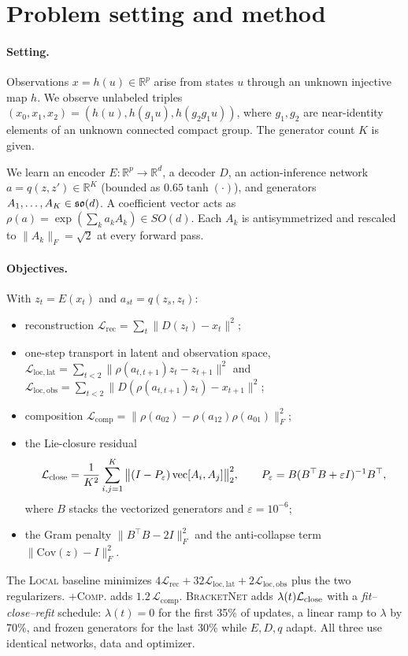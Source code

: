 \section{Problem setting and method}\label{sec:method}
\paragraph{Setting.}
Observations $x=h(u)\in\mathbb R^p$ arise from states $u$ through an unknown injective map $h$. We observe
unlabeled triples $(x_0,x_1,x_2)=(h(u),h(g_1u),h(g_2g_1u))$, where $g_1,g_2$ are near-identity elements of an
unknown connected compact group. The generator count $K$ is given.

We learn an encoder $E:\mathbb R^p\to\mathbb R^d$, a decoder $D$, an action-inference network
$a=q(z,z')\in\mathbb R^K$ (bounded as $0.65\tanh(\cdot)$), and generators $A_1,\dots,A_K\in\mathfrak{so}(d)$. A
coefficient vector acts as $\rho(a)=\exp(\sum_ka_kA_k)\in SO(d)$. Each $A_k$ is antisymmetrized and rescaled
to $\|A_k\|_F=\sqrt2$ at every forward pass.

\paragraph{Objectives.}
With $z_t=E(x_t)$ and $a_{st}=q(z_s,z_t)$:
\begin{itemize}
\item reconstruction $\mathcal L_{\mathrm{rec}}=\sum_t\|D(z_t)-x_t\|^2$;
\item one-step transport in latent and observation space,
  $\mathcal L_{\mathrm{loc,lat}}=\sum_{t<2}\|\rho(a_{t,t+1})z_t-z_{t+1}\|^2$ and
  $\mathcal L_{\mathrm{loc,obs}}=\sum_{t<2}\|D(\rho(a_{t,t+1})z_t)-x_{t+1}\|^2$;
\item composition $\mathcal L_{\mathrm{comp}}=\|\rho(a_{02})-\rho(a_{12})\rho(a_{01})\|_F^2$;
\item the Lie-closure residual
\begin{equation}\label{eq:close}
\mathcal{L}_{\mathrm{close}}=\frac1{K^2}\sum_{i,j=1}^K\big\|(I-P_\varepsilon)\operatorname{vec}[A_i,A_j]\big\|_2^2,\qquad
P_\varepsilon=B(B^\top B+\varepsilon I)^{-1}B^\top ,
\end{equation}
where $B$ stacks the vectorized generators and $\varepsilon=10^{-6}$;
\item the Gram penalty $\|B^\top B-2I\|_F^2$ and the anti-collapse term $\|\mathrm{Cov}(z)-I\|_F^2$.
\end{itemize}

The \textsc{Local} baseline minimizes $4\mathcal L_{\mathrm{rec}}+32\mathcal L_{\mathrm{loc,lat}}+2\mathcal L_{\mathrm{loc,obs}}$
plus the two regularizers. \textsc{+Comp.} adds $1.2\,\mathcal L_{\mathrm{comp}}$. \textsc{BracketNet} adds
$\lambda(t)\mathcal{L}_{\mathrm{close}}$ with a \emph{fit--close--refit} schedule: $\lambda(t)=0$ for the first 35\% of updates, a
linear ramp to $\lambda$ by 70\%, and frozen generators for the last 30\% while $E,D,q$ adapt. All three use
identical networks, data and optimizer.
